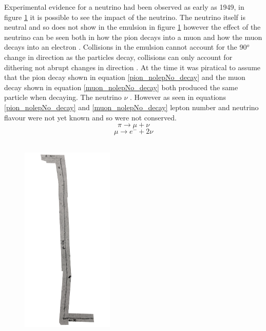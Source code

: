 \documentclass[12pt,a4paper]{article}
\begin{document}
Experimental evidence for a neutrino had been observed as early as 1949, in figure \ref{pion_path} it is possible to see the impact of the neutrino. The neutrino itself is neutral and so does not show in the emulsion in figure \ref{pion_path} however the effect of the neutrino can be seen both in how the pion decays into a muon and how the muon decays into an electron \cite{griffiths2008book} \cite{griffiths2008neutrino1.5}. Collisions in the emulsion cannot account for the 90$^o$ change in direction as the particles decay, collisions can only account for dithering not abrupt changes in direction \cite{griffiths2008book} \cite{griffiths2008neutrino1.5}. At the time it was piratical to assume that the pion decay shown in equation \ref{pion_nolepNo_decay} and the muon decay shown in equation \ref{muon_nolepNo_decay} both produced the same particle when decaying. The neutrino $\nu$ \cite{griffiths2008book} \cite{griffiths2008neutrino1.5}. However as seen in equations \ref{pion_nolepNo_decay} and \ref{muon_nolepNo_decay} lepton number and neutrino flavour were not yet known and so were not conserved.
\begin{equation}
    \pi \rightarrow \mu + \nu
    \label{pion_nolepNo_decay}
\end{equation}
\begin{equation}
    \mu \rightarrow e^- + 2\nu
    \label{muon_nolepNo_decay}
\end{equation}
\\
\begin{figure}
 \centering
 \includegraphics[height=90mm]{less_detailed_proper_path.png}
 \label{pion_path}
\end{figure}
\end{document}
